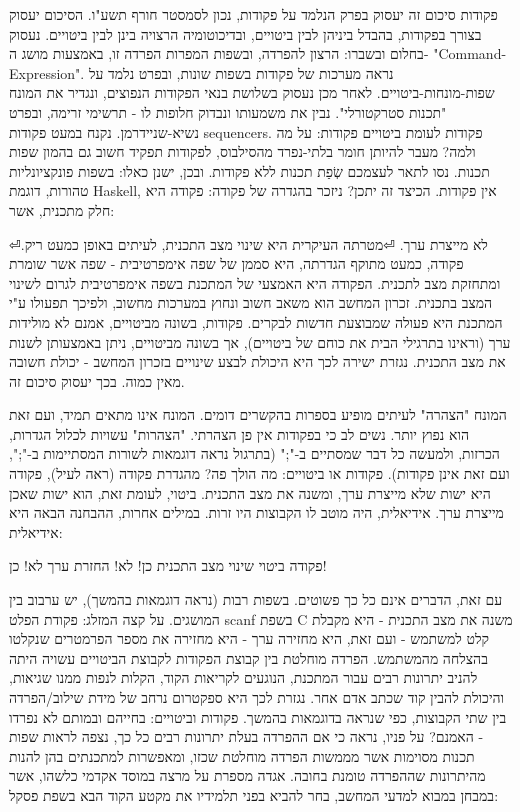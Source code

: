        פקודות
        סיכום זה יעסוק בפרק הנלמד על פקודות, נכון לסמסטר חורף תשע"ו. הסיכום יעסוק בצורך
        בפקודות, בהבדל ביניהן לבין ביטויים, ובדיכוטומיה הרצויה בינן לבין ביטויים. נעסוק
        בחלום ובשברו: הרצון להפרדה, ובשפות המפרות הפרדה זו, באמצעות מושג ה-
        "Command-Expression". נראה מערכות של פקודות בשפות שונות, ובפרט נלמד על
        שפות-מונחות-ביטויים. לאחר מכן נעסוק בשלושת בנאי הפקודות הנפוצים, ונגדיר את
        המונח "תכנות סטרקטורלי". נבין את משמעותו ונבדוק חלופות לו - תרשימי זרימה, ובפרט
        נשיא-שניידרמן. נקנח במעט פקודות sequencers. פקודות לעומת ביטויים
        פקודות: על מה ולמה?
        מעבר להיותן חומר בלתי-נפרד מהסילבוס, לפקודות תפקיד חשוב גם בהמון שפות תכנות. נסו לתאר לעצמכם שְׂפַת תכנות ללא פקודות. ובכן, ישנן כאלו: בשפות פונקציונליות טהורות, דוגמת Haskell, אין פקודות. הכיצד זה יתכן?
        ניזכר בהגדרה של פקודה:
        פקודה היא חלק מתכנית, אשר:
        \begin{ציינון}
⏎לא מייצרת ערך.
⏎מטרתה העיקרית היא שינוי מצב התכנית, לעיתים באופן כמעט ריק.
        פקודה, כמעט מתוקף הגדרתה, היא סממן של שפה אימפרטיבית - שפה אשר שומרת ומתחזקת מצב לתכנית. הפקודה היא האמצעי של המתכנת בשפה אימפרטיבית לגרום לשינוי המצב בתכנית.
        זכרון המחשב הוא משאב חשוב ונחוץ במערכות מחשוב, ולפיכך תפעולו ע"י המתכנת היא פעולה שמבוצעת חדשות לבקרים. פקודות, בשונה מביטויים, אמנם לא מולידות ערך (וראינו בתרגילי הבית את כוחם של ביטויים), אך בשונה מביטויים, ניתן באמצעותן לשנות את מצב התכנית. נגזרת ישירה לכך היא היכולת לבצע שינויים בזכרון המחשב - יכולת חשובה מאין כמוה. בכך יעסוק סיכום זה.
    \end{ציינון}

        המונח "הצהרה" לעיתים מופיע בספרות בהקשרים דומים. המונח אינו מתאים תמיד, ועם זאת הוא נפוץ יותר. נשים לב כי בפקודות אין פן הצהרתי. "הצהרות" עשויות לכלול הגדרות, הכרזות, ולמעשה כל דבר שמסתיים ב-";" (בתרגול נראה דוגמאות לשורות המסתיימות ב-";", ועם זאת אינן פקודות).
        פקודות או ביטויים: מה הולך פה?
        מהגדרת פקודה (ראה לעיל), פקודה היא ישות שלא מייצרת ערך, ומשנה את מצב התכנית. ביטוי, לעומת זאת, הוא ישות שאכן מייצרת ערך. אידיאלית, היה מוטב לו הקבוצות היו זרות. במילים אחרות, ההבחנה הבאה היא אידיאלית:

        פקודה
        ביטוי
        שינוי מצב התכנית
        כן!
        לא!
        החזרת ערך
        לא!
        כן!

        עם זאת, הדברים אינם כל כך פשוטים. בשפות רבות (נראה דוגמאות בהמשך), יש ערבוב בין
        המושגים. על קצה המזלג: פקודת הפלט scanf בשפת C משנה את מצב התכנית - היא מקבלת
        קלט למשתמש - ועם זאת, היא מחזירה ערך - היא מחזירה את מספר הפרמטרים שנקלטו
        בהצלחה מהמשתמש. הפרדה מוחלטת בין קבוצת הפקודות לקבוצת הביטויים עשויה היתה
        להניב יתרונות רבים עבור המתכנת, הנוגעים לקריאות הקוד, הקלות לנפות ממנו שגיאות,
        והיכולת להבין קוד שכתב אדם אחר. נגזרת לכך היא ספקטרום נרחב של מידת שילוב/הפרדה
        בין שתי הקבוצות, כפי שנראה בדוגמאות בהמשך. פקודות וביטויים: בחייהם ובמותם לא
        נפרדו - האמנם? על פניו, נראה כי אם ההפרדה בעלת יתרונות רבים כל כך, נצפה לראות
        שפות תכנות מסוימות אשר מממשות הפרדה מוחלטת שכזו, ומאפשרות למתכנתים בהן להנות
        מהיתרונות שההפרדה טומנת בחובה. אגדה מספרת על מרצה במוסד אקדמי כלשהו, אשר במבחן
        במבוא למדעי המחשב, בחר להביא בפני תלמידיו את מקטע הקוד הבא בשפת פסקל:

